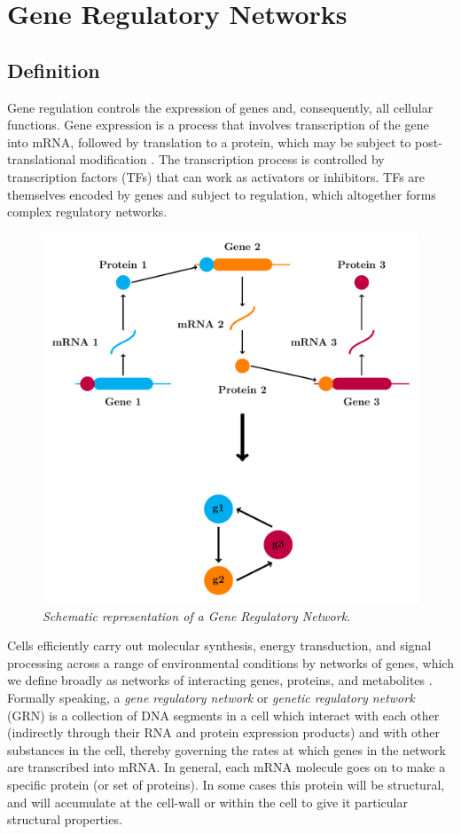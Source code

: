 \chapter{Gene Regulatory Networks}\label{grn}
\lhead[\fancyplain{}{\bfseries\thepage}]{\fancyplain{}{\bfseries\rightmark}}


\section{Definition}

Gene regulation controls the expression of genes and, consequently, all cellular functions. Gene expression is a process that involves transcription of the gene into mRNA, followed by translation to a protein, which may be subject to post-translational modification \cite{K40}. The transcription process is controlled by transcription factors (TFs) that can work as activators or inhibitors. TFs are themselves encoded by genes and subject to regulation, which altogether forms complex regulatory networks. 
\begin{figure}
\centering
\includegraphics[scale=0.4]{images/grnn.pdf}
\caption{\emph{Schematic representation of a Gene Regulatory Network.}}
\end{figure}
Cells efficiently carry out molecular synthesis, energy transduction, and signal processing across a range of environmental conditions by networks of genes, which we define broadly as networks of interacting genes, proteins, and metabolites \cite{K37}. Formally speaking, a \emph{gene regulatory network} or \emph{genetic regulatory network} (GRN) is a collection of DNA segments in a cell which interact with each other (indirectly through their RNA and protein expression products) and with other substances in the cell, thereby governing the rates at which genes in the network are transcribed into mRNA. In general, each mRNA molecule goes on to make a specific protein (or set of proteins). In some cases this protein will be structural, and will accumulate at the cell-wall or within the cell to give it particular structural properties. 

